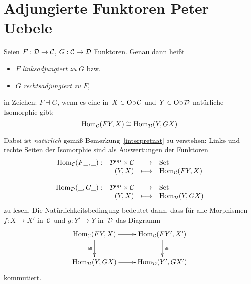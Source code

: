 \section[Adjungierte Funktoren]{Adjungierte Funktoren \hfill \small Peter
Uebele}





\begin{defn}
Seien $F:\mathcal{D}\to\mathcal{C}$, $G:\mathcal{C}\to\mathcal{D}$ Funktoren. Genau dann heißt
\begin{itemize}
\item 
$F$ \emph{linksadjungiert zu} $G$ bzw.
\item 
$G$ \emph{rechtsadjungiert zu} $F$,
\end{itemize}
in Zeichen: $F \dashv G$, wenn es eine in~$X \in \operatorname{Ob}\mathcal{C}$ und~$Y \in \operatorname{Ob}\mathcal{D}$ natürliche
Isomorphie gibt:
\[ \mathrm{Hom}_{\mathcal{C}}(FY,X) \cong \mathrm{Hom}_{\mathcal{D}}(Y,GX) \]
\end{defn}
Dabei ist \emph{natürlich} gemäß Bemerkung~\ref{interpretnat} zu verstehen:
Linke und rechte Seiten der Isomorphie sind als Auswertungen der Funktoren
\[ \begin{array}{@{}rrcl@{}}
  \Hom_\C(F\freist,\freist) :&
    \D^\op \times \C &\longrightarrow& \Set \\
  & (Y,X) &\longmapsto& \Hom_\C(FY, X) \\\\
  \Hom_\D(\freist,G\freist) :&
    \D^\op \times \C &\longrightarrow& \Set \\
  & (Y,X) &\longmapsto& \Hom_\D(Y, GX)
\end{array} \]
zu lesen. Die Natürlichkeitsbedingung bedeutet dann, dass
für alle Morphismen $f:X\rightarrow X'$ in~$\mathcal{C}$ und
$g:Y'\rightarrow Y$ in~$\mathcal{D}$ das Diagramm
\[ \xymatrix{
  \Hom_\C(FY,X) \ar[d]_\cong \ar[r] & \Hom_\C(FY',X') \ar[d]^\cong \\
  \Hom_\D(Y,GX) \ar[r] & \Hom_\D(Y',GX')
} \]
kommutiert.

